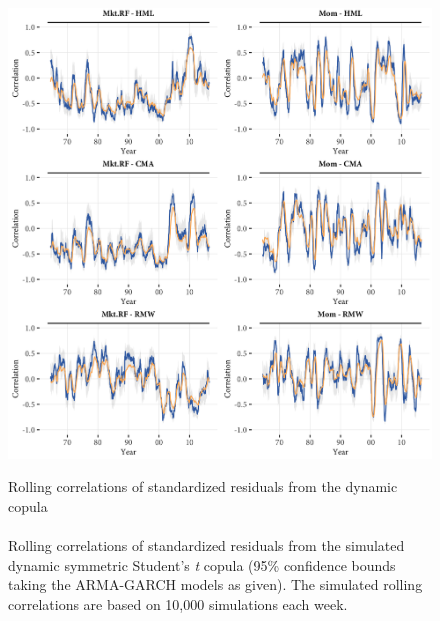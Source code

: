 \begin{figure}[!ht]
  \centering
  \caption{Rolling correlations of standardized residuals from the dynamic copula \\ \quad \\ Rolling correlations of standardized residuals from the simulated dynamic symmetric Student's \textit{t} copula (95\% confidence bounds taking the ARMA-GARCH models as given). The simulated rolling correlations are based on 10,000 simulations each week.}
  \includegraphics[width=\textwidth]{graphics/rolling_simulated1.png}
  \label{fig:rolling_simulated}
\end{figure}
